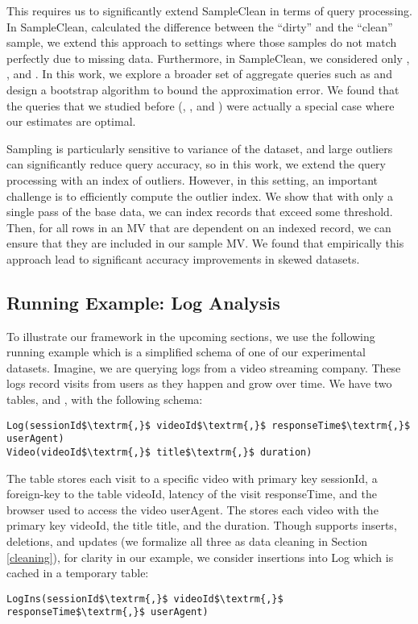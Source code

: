 This requires us to significantly extend SampleClean in terms of query processing.
In SampleClean, \nsc calculated the difference between the ``dirty'' and the ``clean'' sample, we extend this approach to settings where those samples do not match perfectly due to missing data.
Furthermore, in SampleClean, we considered only \sumfunc, \avgfunc, and \countfunc.
In this work, we explore a broader set of aggregate queries such as \medfunc and design a bootstrap algorithm to bound the approximation error.
We found that the queries that we studied before (\sumfunc, \avgfunc, and \countfunc) were actually a special case where our estimates are optimal.

Sampling is particularly sensitive to variance of the dataset, and large outliers can significantly reduce query accuracy, so in this work, we extend the query processing with an index of outliers.
However, in this setting, an important challenge is to efficiently compute the outlier index.
We show that with only a single pass of the base data, we can index records that exceed some threshold.
Then, for all rows in an MV that are dependent on an indexed record, we can ensure that they are included in our sample MV.
We found that empirically this approach lead to significant accuracy improvements in skewed datasets.

\subsection{Running Example: Log Analysis}
To illustrate our framework in the upcoming sections, we use the following running example which is a 
simplified schema of one of our experimental datasets.
Imagine, we are querying logs from a video streaming company. 
These logs record visits from users as they happen and grow over time.
We have two tables,  and , with the following schema:
\begin{lstlisting}[mathescape,basicstyle={\scriptsize}]
Log(sessionId$\textrm{,}$ videoId$\textrm{,}$ responseTime$\textrm{,}$ userAgent)
Video(videoId$\textrm{,}$ title$\textrm{,}$ duration)
\end{lstlisting}
The  table stores each visit to a specific video with primary key \textsf{sessionId}, a foreign-key to the  table \textsf{videoId}, latency of the visit \textsf{responseTime}, and the browser used to access the video \textsf{userAgent}.
The  stores each video with the primary key \textsf{videoId}, the title \textsf{title}, and the \textsf{duration}.
Though \svc supports inserts, deletions, and updates (we formalize all three as data cleaning in Section \ref{cleaning}), for clarity in our example, we consider insertions
into Log which is cached in a temporary table:
\begin{lstlisting}[mathescape,basicstyle={\scriptsize}]
LogIns(sessionId$\textrm{,}$ videoId$\textrm{,}$ responseTime$\textrm{,}$ userAgent)
\end{lstlisting}




